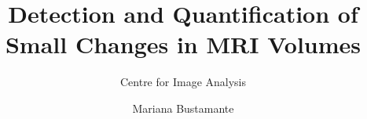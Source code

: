 \documentclass{UUThesisTemplate}
\title{Detection and Quantification of Small Changes in MRI Volumes}
\subtitle{Centre for Image Analysis}
\author{Mariana Bustamante}
\begin{document}
\frontmatter
    \frontmatterCS 
 
   \dedication{Dedicated to all hard-working \\doctoral students at Uppsala University}
 
    
    
    \begingroup
        \tableofcontents
    \endgroup
    

\mainmatter
     
     
     
     
     
     
     

\backmatter
    \nocite{*} %
    
    
\end{document}
